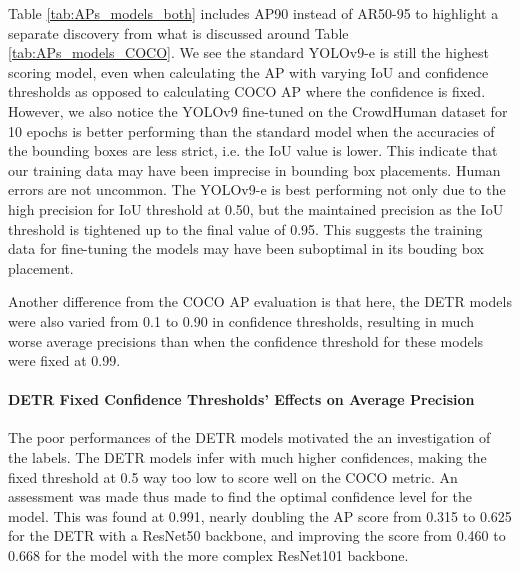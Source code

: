 Table \ref{tab:APs_models_both} includes AP90 instead of AR50-95 to highlight a separate discovery from what is discussed around Table \ref{tab:APs_models_COCO}. We see the standard YOLOv9-e is still the highest scoring model, even when calculating the AP with varying IoU and confidence thresholds as opposed to calculating COCO AP where the confidence is fixed. However, we also notice the YOLOv9 fine-tuned on the CrowdHuman dataset for 10 epochs is better performing than the standard model when the accuracies of the bounding boxes are less strict, i.e. the IoU value is lower. This indicate that our training data may have been imprecise in bounding box placements. Human errors are not uncommon. The YOLOv9-e is best performing not only due to the high precision for IoU threshold at 0.50, but the maintained precision as the IoU threshold is tightened up to the final value of 0.95. This suggests the training data for fine-tuning the models may have been suboptimal in its bouding box placement. 

Another difference from the COCO AP evaluation is that here, the DETR models were also varied from 0.1 to 0.90 in confidence thresholds, resulting in much worse average precisions than when the confidence threshold for these models were fixed at 0.99.

\paragraph{DETR Fixed Confidence Thresholds' Effects on Average Precision}
The poor performances of the DETR models motivated the an investigation of the labels. The DETR models infer with much higher confidences, making the fixed threshold at 0.5 way too low to score well on the COCO metric. An assessment was made thus made to find the optimal confidence level for the model. This was found at 0.991, nearly doubling the AP score from 0.315 to 0.625 for the DETR with a ResNet50 backbone, and improving the score from 0.460 to 0.668 for the model with the more complex ResNet101 backbone.

